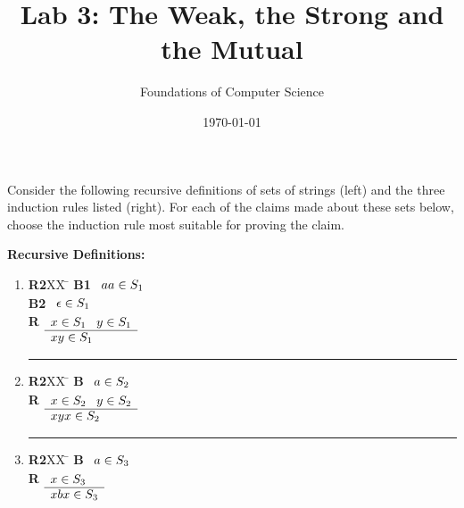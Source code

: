 \documentclass[]{exam}
\title{Lab 3: The Weak, the Strong and the Mutual}
\author{Foundations of Computer Science}
\date{\today}
\begin{document}
\maketitle

\setlength{\columnseprule}{1pt}
\begin{questions}


\question Consider the following recursive definitions of sets of strings
(left) and the three induction rules listed (right).  For each of the 
claims made about these sets below, choose the induction rule most suitable 
for proving the claim. 
\begin{multicols}{2}
{\bf Recursive Definitions:}\\
\begin{enumerate}
\item
\begin{tabbing}
{\bf R2}XX \=  \kill
{\bf B1} \>
        \(\begin{array}[t]{l}
        aa \in S_1
        \end{array}\) \\[2ex]
{\bf B2} \>
        \(\begin{array}[t]{l}
        \epsilon \in S_1
        \end{array}\) \\[2ex]
{\bf R} \>
        \(\begin{array}[t]{l}
        x \in S_1 \;\;\;y \in S_1 \\
        \hline
        xy \in S_1
        \end{array}\)
\end{tabbing}
\hrule
\item
\begin{tabbing}
{\bf R2}XX \=  \kill
{\bf B} \>
        \(\begin{array}[t]{l}
        a \in S_2
        \end{array}\) \\[2ex]
{\bf R} \>
        \(\begin{array}[t]{l}
        x \in S_2 \;\;\;y \in S_2 \\
        \hline
        xyx \in S_2
        \end{array}\)
\end{tabbing}
\hrule

\item
\begin{tabbing}
{\bf R2}XX \=  \kill
{\bf B} \>
        \(\begin{array}[t]{l}
        a \in S_3
        \end{array}\) \\[2ex]
{\bf R} \>
        \(\begin{array}[t]{l}
        x \in S_3 \\
        \hline
        xbx \in S_3
        \end{array}\)
\end{tabbing}
\end{enumerate}


\end{multicols}
\end{questions}
\end{document}
